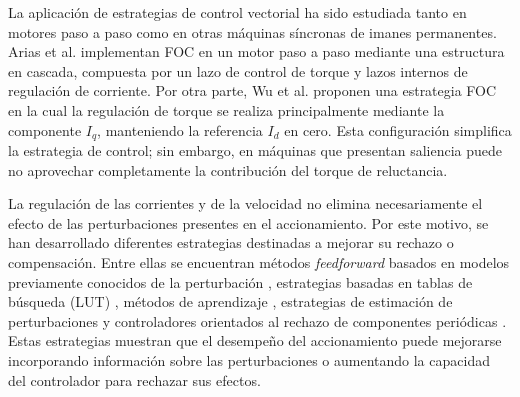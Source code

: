 %
%
%
%
%

La aplicación de estrategias de control vectorial ha sido estudiada tanto en motores paso a paso como en otras máquinas síncronas de imanes permanentes. Arias et al. \cite{ariasReducingCoggingTorque2019} implementan FOC en un motor paso a paso mediante una estructura en cascada, compuesta por un lazo de control de torque y lazos internos de regulación de corriente. Por otra parte, Wu et al. \cite{wuSpeedControlLowSpeed2025} proponen una estrategia FOC en la cual la regulación de torque se realiza principalmente mediante la componente \(I_q\), manteniendo la referencia \(I_d\) en cero. Esta configuración simplifica la estrategia de control; sin embargo, en máquinas que presentan saliencia puede no aprovechar completamente la contribución del torque de reluctancia.

La regulación de las corrientes y de la velocidad no elimina necesariamente
el efecto de las perturbaciones presentes en el accionamiento. Por este motivo,
se han desarrollado diferentes estrategias destinadas a mejorar su rechazo o
compensación. Entre ellas se encuentran métodos \textit{feedforward} basados
en modelos previamente conocidos de la perturbación
\cite{deangeloControlParaMaquinas2004,picatosteruilopeModellingControlStepper2014,zhangSmoothSensorlessStartup2026},
estrategias basadas en tablas de búsqueda (LUT)
\cite{piccoliCoggingTorqueRipple2014a,wenCurrentSensorlessModel2024,wuDesignImplementationPositionBased2019,guzinskiSensorlessLowSpeed2019},
métodos de aprendizaje
\cite{mandraPerformanceEnhancedRobustIterative2019},
estrategias de estimación de perturbaciones
\cite{deangeloControlParaMaquinas2004,picatosteruilopeModellingControlStepper2014,yuSimultaneousStateDisturbances2025}
y controladores orientados al rechazo de componentes periódicas
\cite{ariasReducingCoggingTorque2019,wuSpeedControlLowSpeed2025,sekineSuppressionVelocityPulsations2024}.
Estas estrategias muestran que el desempeño del accionamiento puede mejorarse
incorporando información sobre las perturbaciones o aumentando la capacidad
del controlador para rechazar sus efectos.




